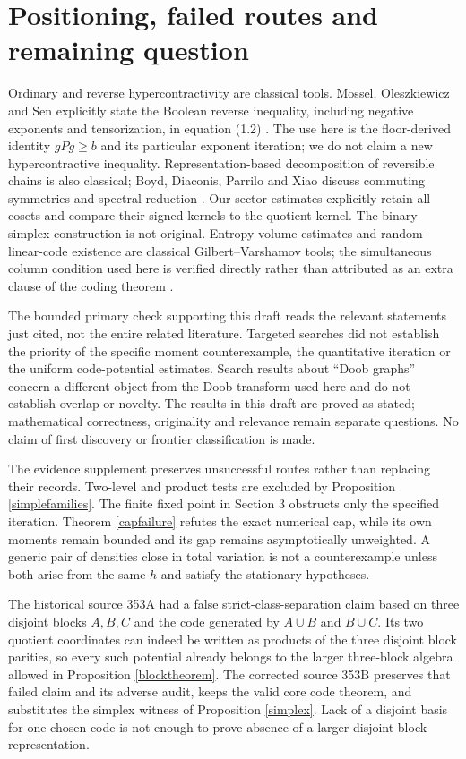\documentclass[11pt]{article}
\begin{document}
\section{Positioning, failed routes and remaining question}
Ordinary and reverse hypercontractivity are classical tools. Mossel, Oleszkiewicz and Sen explicitly state the Boolean reverse inequality, including negative exponents and tensorization, in equation (1.2) \cite{mos}. The use here is the floor-derived identity $gPg\geq b$ and its particular exponent iteration; we do not claim a new hypercontractive inequality. Representation-based decomposition of reversible chains is also classical; Boyd, Diaconis, Parrilo and Xiao discuss commuting symmetries and spectral reduction \cite{boyd}. Our sector estimates explicitly retain all cosets and compare their signed kernels to the quotient kernel. The binary simplex construction is not original. Entropy-volume estimates and random-linear-code existence are classical Gilbert--Varshamov tools; the simultaneous column condition used here is verified directly rather than attributed as an extra clause of the coding theorem \cite{guruswami}.

The bounded primary check supporting this draft reads the relevant statements just cited, not the entire related literature. Targeted searches did not establish the priority of the specific moment counterexample, the quantitative iteration or the uniform code-potential estimates. Search results about ``Doob graphs'' concern a different object from the Doob transform used here and do not establish overlap or novelty. The results in this draft are proved as stated; mathematical correctness, originality and relevance remain separate questions. No claim of first discovery or frontier classification is made.

The evidence supplement preserves unsuccessful routes rather than replacing their records. Two-level and product tests are excluded by Proposition \ref{simplefamilies}. The finite fixed point in Section 3 obstructs only the specified iteration. Theorem \ref{capfailure} refutes the exact numerical cap, while its own moments remain bounded and its gap remains asymptotically unweighted. A generic pair of densities close in total variation is not a counterexample unless both arise from the same $h$ and satisfy the stationary hypotheses.

The historical source 353A had a false strict-class-separation claim based on three disjoint blocks $A,B,C$ and the code generated by $A\cup B$ and $B\cup C$. Its two quotient coordinates can indeed be written as products of the three disjoint block parities, so every such potential already belongs to the larger three-block algebra allowed in Proposition \ref{blocktheorem}. The corrected source 353B preserves that failed claim and its adverse audit, keeps the valid core code theorem, and substitutes the simplex witness of Proposition \ref{simplex}. Lack of a disjoint basis for one chosen code is not enough to prove absence of a larger disjoint-block representation.
\end{document}
